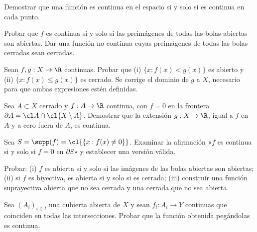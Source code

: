 \begin{ejercicio}\label{ej:lectura-5-2}
Demostrar que una función es continua en el espacio si y solo si es continua en cada punto.
\end{ejercicio}


\begin{ejercicio}\label{ej:lectura-5-3}
Probar que $f$ es continua si y solo si las preimágenes de todas las bolas abiertas son abiertas. Dar una función no continua cuyas preimágenes de todas las bolas cerradas sean cerradas.
\end{ejercicio}


\begin{ejercicio}\label{ej:lectura-5-4}
Sean $f,g:X\to\R$ continuas. Probar que (i) $\{x:f(x)<g(x)\}$ es abierto y (ii) $\{x:f(x)\le g(x)\}$ es cerrado. Se corrige el dominio de $g$ a $X$, necesario para que ambas expresiones estén definidas.
\end{ejercicio}


\begin{ejercicio}\label{ej:lectura-5-5}
Sea $A\subset X$ cerrado y $f:A\to\R$ continua, con $f=0$ en la frontera $\partial A=\cl A\cap\cl{X\setminus A}$. Demostrar que la extensión $g:X\to\R$, igual a $f$ en $A$ y a cero fuera de $A$, es continua.
\end{ejercicio}


\begin{ejercicio}\label{ej:lectura-5-6}
Sea $S=\supp(f)=\cl{\{x:f(x)\ne0\}}$. Examinar la afirmación «$f$ es continua si y solo si $f=0$ en $\partial S$» y establecer una versión válida.
\end{ejercicio}


\begin{ejercicio}\label{ej:lectura-5-7}
Probar: (i) $f$ es abierta si y solo si las imágenes de las bolas abiertas son abiertas; (ii) si $f$ es biyectiva, es abierta si y solo si es cerrada; (iii) construir una función suprayectiva abierta que no sea cerrada y una cerrada que no sea abierta.
\end{ejercicio}


\begin{ejercicio}\label{ej:lectura-5-8}
Sea $(A_i)_{i\in I}$ una cubierta abierta de $X$ y sean $f_i:A_i\to Y$ continuas que coinciden en todas las intersecciones. Probar que la función obtenida pegándolas es continua.
\end{ejercicio}


